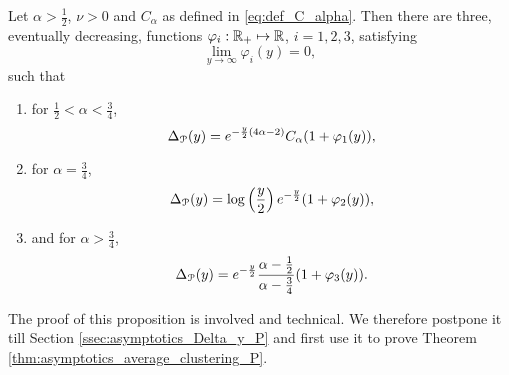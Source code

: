 \begin{proposition}\label{prop:asymptotics_Delta_y_P}
Let $\alpha > \frac{1}{2}$, $\nu > 0$ and $C_\alpha$ as defined in \eqref{eq:def_C_alpha}. Then there are three, eventually decreasing, functions $\varphi_i : {\mathbb R}_+ \mapsto {\ensuremath{\mathbb R}}$, $i = 1,2,3$, satisfying
\[
	\lim_{y \to \infty} \varphi_i(y) = 0, 
\]
such that 
\begin{enumerate}
\item for $\frac{1}{2} < \alpha < \frac{3}{4}$,
\[
	\Delta_{{\mathcal P}}(y) = e^{-\frac{y}{2}(4\alpha - 2)} C_\alpha (1 + \varphi_1(y)),
\]
\item for $\alpha = \frac{3}{4}$,
\[
	\Delta_{{\mathcal P}}(y) = \log\left(\frac{y}{2}\right)e^{-\frac{y}{2}}(1 + \varphi_2(y)),
\]
\item and for $\alpha > \frac{3}{4}$,
\[
	\Delta_{{\mathcal P}}(y) = e^{-\frac{y}{2}} \frac{\alpha - \frac{1}{2}}{\alpha - \frac{3}{4}} (1 + \varphi_3(y)).
\]
\end{enumerate}
\end{proposition}

The proof of this proposition is involved and technical. We therefore postpone it till Section \ref{ssec:asymptotics_Delta_y_P}  and first use it to prove Theorem \ref{thm:asymptotics_average_clustering_P}. 

